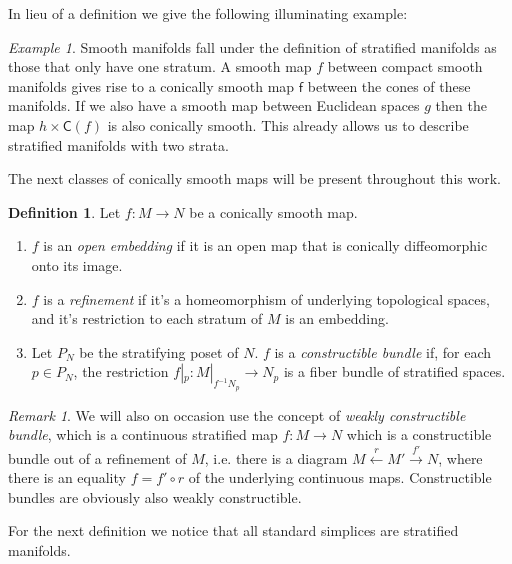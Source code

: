 \documentclass[12pt,a4paper]{article}
\newcounter{counter} \numberwithin{counter}{section}
\theoremstyle{definition}
\newtheorem{definition}[counter]{Definition}
\theoremstyle{plain}
\theoremstyle{remark}
\newtheorem{example}[counter]{Example}
\newtheorem{remark}[counter]{Remark}
\begin{document}
In lieu of a definition we give the following illuminating example:
%
\begin{example}
    Smooth manifolds fall under the definition of stratified manifolds as those that only have one stratum. A smooth map $f$ between compact smooth manifolds gives rise to a conically smooth map $\mathsf{f}$ between the cones of these manifolds. If we also have a smooth map between Euclidean spaces $g$ then the map $h \times \mathsf{C}(f)$ is also conically smooth. This already allows us to describe stratified manifolds with two strata.
\end{example}

The next    classes of conically smooth maps will be present throughout this work.

\begin{definition}
    Let $f: M \rightarrow N$ be a conically smooth map.
    \begin{enumerate}
        \item $f$ is an \emph{open embedding} if it is an open map that is conically diffeomorphic onto its image.
        \item $f$ is a \emph{refinement} if it's a homeomorphism of underlying topological spaces, and it's restriction to each stratum of $M$ is an embedding.
        \item Let $P_N$ be the stratifying poset of $N$. $f$ is a \emph{constructible bundle} if, for each $p \in P_N$, the restriction $f|_p: M|_{f^{-1} N_p} \rightarrow N_p$ is a fiber bundle of stratified spaces.
    \end{enumerate}
\end{definition}

\begin{remark}
    We will also on occasion use the concept of \emph{weakly constructible bundle}, which is a continuous stratified map $f: M \rightarrow N$ which is a constructible bundle out of a refinement of $M$, i.e. there is a diagram $M \xleftarrow{r} M' \xrightarrow{f'} N$, where there is an equality $f = f' \circ r$ of the underlying continuous maps. Constructible bundles are obviously also weakly constructible.
\end{remark}

For the next definition we notice that all standard simplices are stratified manifolds.
\end{document}
